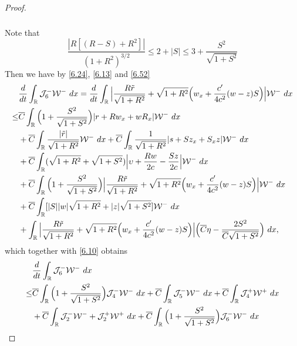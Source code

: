 \documentclass[10pt,a4paper]{amsart}
\newcommand{\fr}{\frac}
\begin{document}
\begin{proof}
\begin{align}
\begin{split}
\end{split}
\end{align}
Note that
$$
\fr{|R[(R-S)+R^2]|}{(1+R^2)^{3/2}}\leq 2+|S|\leq 3+\fr{S^2}{\sqrt{1+S^2}}
$$
Then we have by \eqref{6.24}, \eqref{6.13} and \eqref{6.52}
\begin{align*}
\begin{split}
&\fr{{\rm d}}{{\rm d}t}\int_{\mathbb{R}} \mathcal{J}_{6}^-\mathcal{W}^-\ {\rm d}x
= \fr{{\rm d}}{{\rm d}t}\int_{\mathbb{R}} \Big|\fr{R\tilde{r}}{\sqrt{1+R^2}} +\sqrt{1+R^2}\Big(w_x+\fr{c'}{4c^2}(w-z)S\Big)\Big|\mathcal{W}^-\ {\rm d}x \\
\leq & \overline{C}\int_{\mathbb{R}} \Big(1+\fr{S^2}{\sqrt{1+S^2}}\Big)|r+Rw_x+wR_x| \mathcal{W}^-\ {\rm d}x \\
&+\overline{C}\int_{\mathbb{R}} \fr{|\tilde{r}|}{\sqrt{1+R^2}} \mathcal{W}^-\ {\rm d}x +\overline{C}\int_{\mathbb{R}} \fr{1}{\sqrt{1+R^2}}|s+Sz_x +S_xz|\mathcal{W}^-\ {\rm d}x \\ & +\overline{C}\int_{\mathbb{R}} (\sqrt{1+R^2}+\sqrt{1+S^2})\Big|\upsilon+\fr{Rw}{2c}-\fr{Sz}{2c}\Big|\mathcal{W}^-\ {\rm d}x \\ &+\overline{C}\int_{\mathbb{R}}\Big(1+\fr{S^2}{\sqrt{1+S^2}}\Big)\Big|\fr{R\tilde{r}}{\sqrt{1+R^2}} +\sqrt{1+R^2}\Big(w_x+\fr{c'}{4c^2}(w-z)S\Big)\Big| \mathcal{W}^-\ {\rm d}x \\
&+\overline{C}\int_{\mathbb{R}}  [|S||w|\sqrt{1+R^2}+|z|\sqrt{1+S^2}] \mathcal{W}^-\ {\rm d}x \\
&+\int_{\mathbb{R}}\Big|\fr{R\tilde{r}}{\sqrt{1+R^2}} +\sqrt{1+R^2}\Big(w_x+\fr{c'}{4c^2}(w-z)S\Big)\Big| \Big(\overline{C}\eta-\fr{2S^2}{\overline{C}\sqrt{1+S^2}}\Big)\ {\rm d}x,
\end{split}
\end{align*}
which together with \eqref{6.10} obtains
\begin{align}\label{6.53}
\begin{split}
&\fr{{\rm d}}{{\rm d}t}\int_{\mathbb{R}} \mathcal{J}_{6}^-\mathcal{W}^-\ {\rm d}x \\
\leq & \overline{C}\int_{\mathbb{R}} \Big(1+\fr{S^2}{\sqrt{1+S^2}}\Big) \mathcal{J}_{4}^- \mathcal{W}^-\ {\rm d}x  +\overline{C}\int_{\mathbb{R}} \mathcal{J}_{5}^- \mathcal{W}^-\ {\rm d}x +\overline{C}\int_{\mathbb{R}} \mathcal{J}_{4}^+\mathcal{W}^+\ {\rm d}x \\ & +\overline{C}\int_{\mathbb{R}}\mathcal{J}_{2}^-\mathcal{W}^- +\mathcal{J}_{2}^+\mathcal{W}^+\ {\rm d}x +\overline{C}\int_{\mathbb{R}}\Big(1+\fr{S^2}{\sqrt{1+S^2}}\Big)\mathcal{J}_{6}^-\mathcal{W}^-\ {\rm d}x \\

\end{split}
\end{align}
\end{proof}
\end{document}
